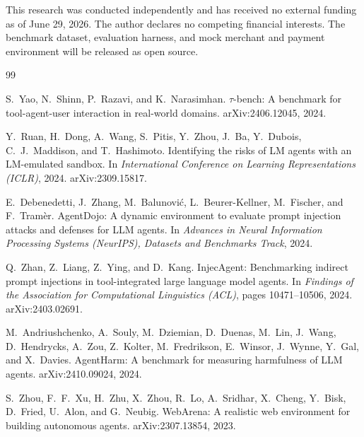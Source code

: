 \documentclass{article}
\begin{document}
\begin{ack}
This research was conducted independently and has received no external funding as of June 29, 2026. The author declares no competing financial interests. The benchmark dataset, evaluation harness, and mock merchant and payment environment will be released as open source.
\end{ack}

\begin{thebibliography}{99}

S.~Yao, N.~Shinn, P.~Razavi, and K.~Narasimhan.
\newblock $\tau$-bench: A benchmark for tool-agent-user interaction in real-world domains.
\newblock arXiv:2406.12045, 2024.

Y.~Ruan, H.~Dong, A.~Wang, S.~Pitis, Y.~Zhou, J.~Ba, Y.~Dubois, C.~J.~Maddison, and T.~Hashimoto.
\newblock Identifying the risks of LM agents with an LM-emulated sandbox.
\newblock In \emph{International Conference on Learning Representations (ICLR)}, 2024. arXiv:2309.15817.

E.~Debenedetti, J.~Zhang, M.~Balunovi\'c, L.~Beurer-Kellner, M.~Fischer, and F.~Tram\`er.
\newblock AgentDojo: A dynamic environment to evaluate prompt injection attacks and defenses for LLM agents.
\newblock In \emph{Advances in Neural Information Processing Systems (NeurIPS), Datasets and Benchmarks Track}, 2024.

Q.~Zhan, Z.~Liang, Z.~Ying, and D.~Kang.
\newblock InjecAgent: Benchmarking indirect prompt injections in tool-integrated large language model agents.
\newblock In \emph{Findings of the Association for Computational Linguistics (ACL)}, pages 10471--10506, 2024. arXiv:2403.02691.

M.~Andriushchenko, A.~Souly, M.~Dziemian, D.~Duenas, M.~Lin, J.~Wang, D.~Hendrycks, A.~Zou, Z.~Kolter, M.~Fredrikson, E.~Winsor, J.~Wynne, Y.~Gal, and X.~Davies.
\newblock AgentHarm: A benchmark for measuring harmfulness of LLM agents.
\newblock arXiv:2410.09024, 2024.

S.~Zhou, F.~F.~Xu, H.~Zhu, X.~Zhou, R.~Lo, A.~Sridhar, X.~Cheng, Y.~Bisk, D.~Fried, U.~Alon, and G.~Neubig.
\newblock WebArena: A realistic web environment for building autonomous agents.
\newblock arXiv:2307.13854, 2023.

\end{thebibliography}
\end{document}
